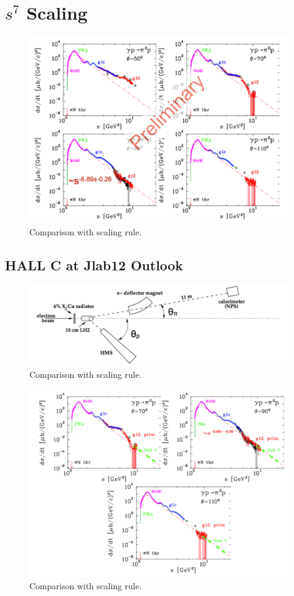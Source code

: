 \documentclass{aip-cp}
\begin{document}
\section{$s^7$ Scaling}
\begin{figure}[h]
	\centerline{\includegraphics[width=225 pt]{figures/pi0_scaling.pdf}}
	\caption{Comparison with scaling rule. }
	\label{fig:pi0_scaling}
\end{figure}
\subsection{HALL C at Jlab12 Outlook}
\begin{figure}[h]
	\centerline{\includegraphics[width=225 pt]{figures/HALLC12.pdf}}
	\caption{Comparison with scaling rule. }
	\label{fig:hallc12}
\end{figure}
\begin{figure}[h]
	\centerline{\includegraphics[width=225 pt]{figures/HallC_projected.pdf}}
	\caption{Comparison with scaling rule. }
	\label{fig:pi0_projected}
\end{figure}

\nocite{*}
%
%
\end{document}

